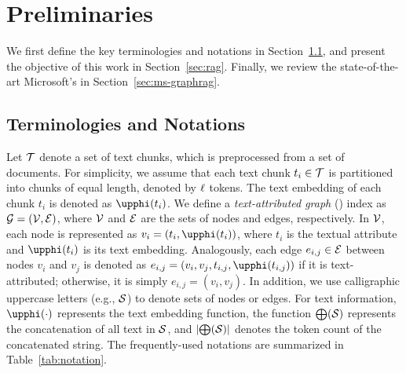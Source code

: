 \section{Preliminaries}
We first define the key terminologies and notations in Section~\ref{sec:notations}, and present the objective of this work in Section~\ref{sec:rag}. Finally, we review the state-of-the-art Microsoft's \graphrag in Section~\ref{sec:ms-graphrag}.



\subsection{Terminologies and Notations}\label{sec:notations}
Let $\mathcal{T}$ denote a set of text chunks, which is preprocessed from a set of documents. For simplicity, we assume that each text chunk $t_i \in \mathcal{T}$ is partitioned into chunks of equal length, denoted by $\ell$ tokens. The text embedding of each chunk $t_i$ is denoted as $\temb{t_i}$.
We define a \textit{text-attributed graph} (\textgraph) index as $\mathcal{G} = (\mathcal{V}, \mathcal{E})$, where $\mathcal{V}$ and $\mathcal{E}$ are the sets of nodes and edges, respectively. 
In $\mathcal{V}$, each node is represented as $v_i=(t_i,\temb{t_i})$, where $t_i$ is the textual attribute and $\temb{t_i}$ is its text embedding. Analogously, each edge $e_{i,j}\in \mathcal{E}$ between nodes $v_i$ and $v_j$ is denoted as $e_{i,j}=(v_i, v_j, t_{i,j},\temb{t_{i,j}})$ if it is text-attributed; otherwise, it is simply $e_{i,j} = (v_i, v_j)$. In addition, we use calligraphic uppercase letters (e.g., $\mathcal{\mathcal{S}}$) to denote sets of nodes or edges. For text information, $\temb{\cdot}$ represents the text embedding function, the function $\bigoplus(\mathcal{S})$ represents the concatenation of all text in $\mathcal{S}$, and $\left|\bigoplus(\mathcal{S})\right|$ denotes the token count of the concatenated string.
The frequently-used notations are summarized in Table~\ref{tab:notation}.

